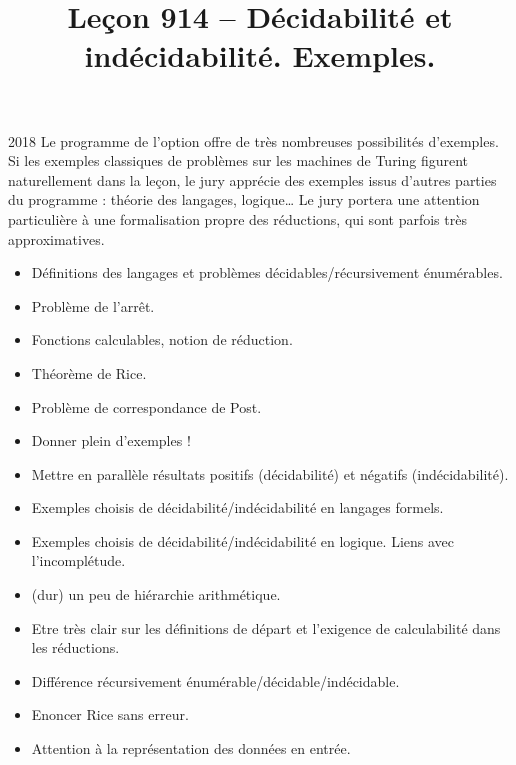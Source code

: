\documentclass{agregfiche}
\title{Leçon 914 -- Décidabilité et indécidabilité. Exemples.}
\begin{document}
\maketitle

\secrapports

\begin{rapport}{2018}
Le programme de l'option offre de très nombreuses possibilités d'exemples. Si les exemples classiques de problèmes sur les machines de Turing figurent naturellement dans la leçon, le jury apprécie des exemples issus d'autres parties du programme : théorie des langages, logique\dots
Le jury portera une attention particulière à une formalisation propre des réductions, qui sont parfois très approximatives.
\end{rapport}

\secindispensables

\begin{itemize}
\item Définitions des langages et problèmes décidables/récursivement énumérables.
\item Problème de l'arrêt.
\item Fonctions calculables, notion de réduction.
\item Théorème de Rice.
\item Problème de correspondance de Post.
\item Donner plein d'exemples !
\end{itemize}


\secidees
\begin{itemize}
\item Mettre en parallèle résultats positifs (décidabilité) et négatifs (indécidabilité).
\item Exemples choisis de décidabilité/indécidabilité en langages formels.
\item Exemples choisis de décidabilité/indécidabilité en logique. Liens avec l'incomplétude.
\item (dur) un peu de hiérarchie arithmétique.
\end{itemize}

\secpieges

\begin{itemize}
\item Etre très clair sur les définitions de départ et l'exigence de calculabilité dans les réductions.
\item Différence récursivement énumérable/décidable/indécidable.
\item Enoncer Rice sans erreur.
\item Attention à la représentation des données en entrée.
\end{itemize}
\end{document}
